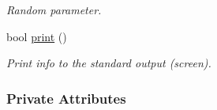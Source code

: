 \begin{CompactItemize}
\begin{CompactList}\small\item\em Random parameter. \item\end{CompactList}\item 
\hypertarget{classRectBlocksKnots_4aff1f0bd205e542f263d7eab6070fc0}{
bool \hyperlink{classRectBlocksKnots_4aff1f0bd205e542f263d7eab6070fc0}{print} ()}
\label{classRectBlocksKnots_4aff1f0bd205e542f263d7eab6070fc0}

\begin{CompactList}\small\item\em Print info to the standard output (screen). \item\end{CompactList}\end{CompactItemize}
\subsubsection*{Private Attributes}
